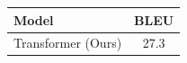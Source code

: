 \begin{tabular}{lc}
\hline
Model & BLEU \\
\hline
Transformer (Ours) & 27.3 \\
\hline
\end{tabular}
